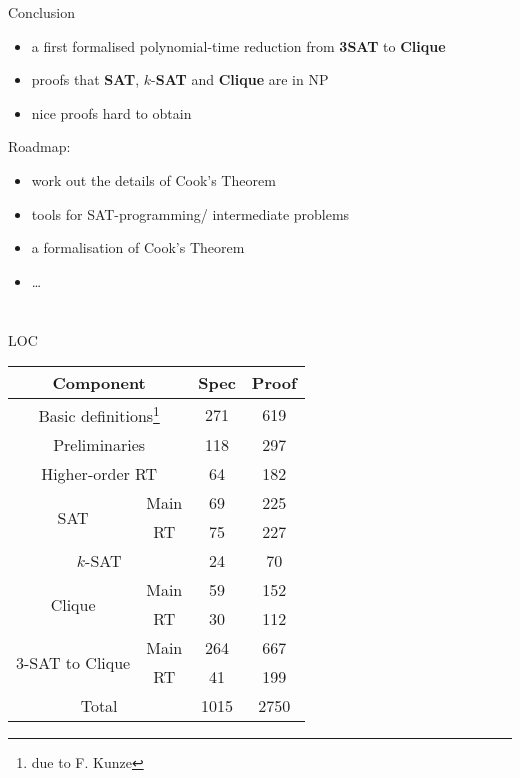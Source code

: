 \documentclass[11pt,usenames,dvipsnames,
  hyperref={pdfencoding=auto,psdextra}]{beamer}
\makeatletter
\def\beamer@writeslidentry@miniframesoff{%
  \expandafter\beamer@ifempty\expandafter{\beamer@framestartpage}{}%
  {%
    \clearpage\beamer@notesactions%
  }
}
\newcommand*{\miniframesoff}{\let\beamer@writeslidentry=\beamer@writeslidentry@miniframesoff}
\makeatother
\begin{document}


\begin{frame}{Conclusion}
  \begin{itemize}
    \item a first formalised polynomial-time reduction from \textbf{3SAT} to \textbf{Clique}
    \item proofs that \textbf{SAT}, $k$-\textbf{SAT} and \textbf{Clique} are in NP
    \item nice proofs hard to obtain
  \end{itemize}

  \vspace{5ex}

  Roadmap:
  \begin{itemize}
    \item work out the details of Cook's Theorem
    \item tools for SAT-programming/ intermediate problems
    \item a formalisation of Cook's Theorem
    \item \ldots 
  \end{itemize}
\end{frame}

\miniframesoff
\section{}


\begin{frame}{LOC}
  \begin{center}
  \begin{tabular}{cccc}
    \multicolumn{2}{c}{Component} & Spec & Proof \\
    \midrule
    \multicolumn{2}{c}{Basic definitions\footnote{due to F. Kunze}} & 271 & 619\\
    \multicolumn{2}{c}{Preliminaries} & 118 & 297 \\
    \multicolumn{2}{c}{Higher-order RT} & 64 & 182 \\
    \midrule
    \multirow{2}{*}{SAT} & Main & 69 & 225 \\
    & RT & 75 & 227 \\
    \midrule
    \multicolumn{2}{c}{$k$-SAT} & 24 & 70 \\
    \midrule
    \multirow{2}{*}{Clique} & Main & 59 & 152 \\
    & RT & 30 & 112 \\
    \midrule
    \multirow{2}{*}{3-SAT to Clique} & Main & 264 & 667 \\
    & RT & 41 & 199\\
    \midrule
    \multicolumn{2}{c}{Total} & 1015 & 2750

  \end{tabular}
  \end{center}
\end{frame}
\end{document}
